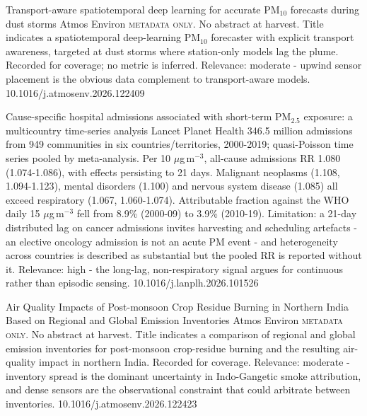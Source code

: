 \documentclass[10pt]{article}
\begin{document}
{Transport-aware spatiotemporal deep learning for accurate PM$_{10}$ forecasts during dust storms}
{Atmos Environ}
{\textsc{metadata only.} No abstract at harvest. Title indicates a spatiotemporal deep-learning PM$_{10}$ forecaster with explicit transport awareness, targeted at dust storms where station-only models lag the plume. Recorded for coverage; no metric is inferred. Relevance: moderate - upwind sensor placement is the obvious data complement to transport-aware models.}
{10.1016/j.atmosenv.2026.122409}

\par{}\baselineskip{}\baselineskip
{}

{Cause-specific hospital admissions associated with short-term PM$_{2.5}$ exposure: a multicountry time-series analysis}
{Lancet Planet Health}
{346.5 million admissions from 949 communities in six countries/territories, 2000-2019; quasi-Poisson time series pooled by meta-analysis. Per 10 $\mu$g\,m$^{-3}$, all-cause admissions RR 1.080 (1.074-1.086), with effects persisting to 21 days. Malignant neoplasms (1.108, 1.094-1.123), mental disorders (1.100) and nervous system disease (1.085) all exceed respiratory (1.067, 1.060-1.074). Attributable fraction against the WHO daily 15 $\mu$g\,m$^{-3}$ fell from 8.9\% (2000-09) to 3.9\% (2010-19). Limitation: a 21-day distributed lag on cancer admissions invites harvesting and scheduling artefacts - an elective oncology admission is not an acute PM event - and heterogeneity across countries is described as substantial but the pooled RR is reported without it. Relevance: high - the long-lag, non-respiratory signal argues for continuous rather than episodic sensing.}
{10.1016/j.lanplh.2026.101526}

{Air Quality Impacts of Post-monsoon Crop Residue Burning in Northern India Based on Regional and Global Emission Inventories}
{Atmos Environ}
{\textsc{metadata only.} No abstract at harvest. Title indicates a comparison of regional and global emission inventories for post-monsoon crop-residue burning and the resulting air-quality impact in northern India. Recorded for coverage. Relevance: moderate - inventory spread is the dominant uncertainty in Indo-Gangetic smoke attribution, and dense sensors are the observational constraint that could arbitrate between inventories.}
{10.1016/j.atmosenv.2026.122423}
\end{document}
